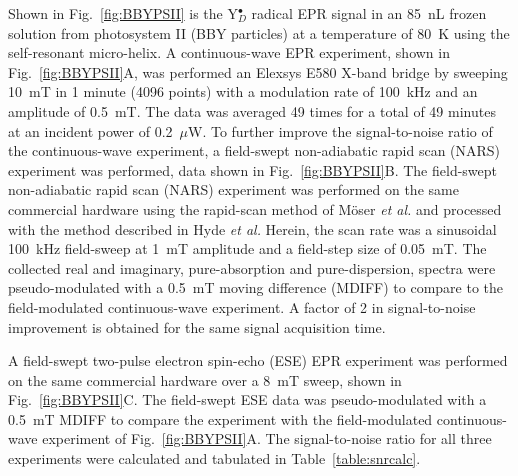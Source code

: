 Shown in Fig.~\ref{fig:BBYPSII} is the Y$_D^\bullet$ radical EPR signal in an 85~nL frozen solution from photosystem II (BBY particles) at a temperature of 80~K using the self-resonant micro-helix. A continuous-wave EPR experiment, shown in Fig.~\ref{fig:BBYPSII}A, was performed an Elexsys E580 X-band bridge by sweeping 10~mT in 1 minute (4096 points) with a modulation rate of 100~kHz and an amplitude of 0.5~mT. The data was averaged 49 times for a total of 49 minutes at an incident power of 0.2~$\mu$W. To further improve the signal-to-noise ratio of the continuous-wave experiment, a field-swept non-adiabatic rapid scan (NARS) experiment was performed, data shown in Fig.~\ref{fig:BBYPSII}B. The field-swept non-adiabatic rapid scan (NARS) experiment was performed on the same commercial hardware using the rapid-scan method of M\"{o}ser {\em et al.}\cite{MOSER2017} and processed with the method described in Hyde {\em et al.}\cite{Hyde2013MDIFF} Herein, the scan rate was a sinusoidal 100~kHz field-sweep at 1~mT amplitude and a field-step size of 0.05~mT. The collected real and imaginary, pure-absorption and pure-dispersion, spectra were pseudo-modulated with a 0.5~mT moving difference (MDIFF)\cite{Hyde2013MDIFF} to compare to the field-modulated continuous-wave experiment. A factor of 2 in signal-to-noise improvement is obtained for the same signal acquisition time. 

A field-swept two-pulse electron spin-echo (ESE) EPR experiment was performed on the same commercial hardware over a 8~mT sweep, shown in Fig.~\ref{fig:BBYPSII}C. The field-swept ESE data was pseudo-modulated with a 0.5~mT MDIFF to compare the experiment with the field-modulated continuous-wave experiment of Fig.~\ref{fig:BBYPSII}A. The signal-to-noise ratio for all three experiments were calculated and tabulated in Table~\ref{table:snrcalc}. 

